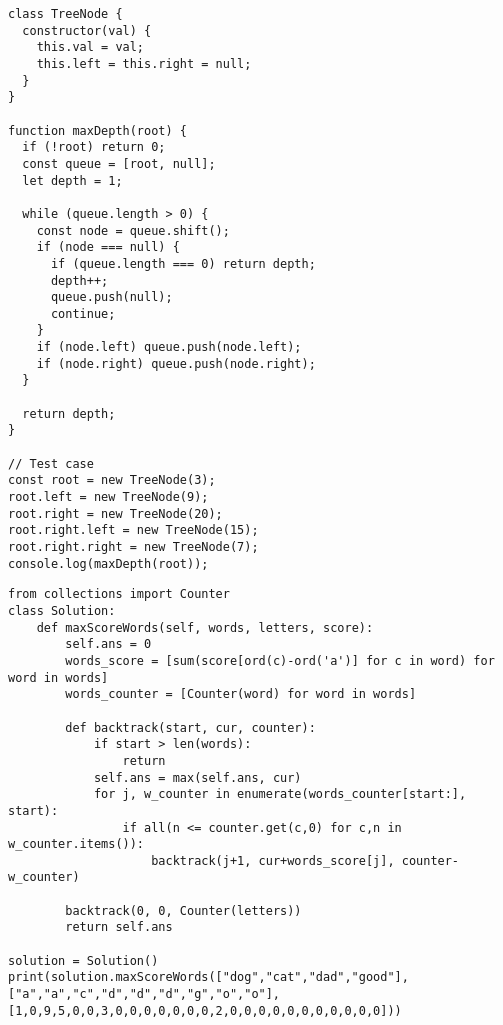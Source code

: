 \begin{tcolorbox}[left=0mm,right=0mm,top=0mm,bottom=0mm,boxsep=1mm,arc=0mm,boxrule=0pt, frame empty, breakable]
    \small
    \begin{lstlisting}
class TreeNode {
  constructor(val) {
    this.val = val;
    this.left = this.right = null;
  }
}

function maxDepth(root) {
  if (!root) return 0;
  const queue = [root, null];
  let depth = 1;

  while (queue.length > 0) {
    const node = queue.shift();
    if (node === null) {
      if (queue.length === 0) return depth;
      depth++;
      queue.push(null);
      continue;
    }
    if (node.left) queue.push(node.left);
    if (node.right) queue.push(node.right);
  }

  return depth;
}

// Test case
const root = new TreeNode(3);
root.left = new TreeNode(9);
root.right = new TreeNode(20);
root.right.left = new TreeNode(15);
root.right.right = new TreeNode(7);
console.log(maxDepth(root));
\end{lstlisting}
\end{tcolorbox}



\begin{tcolorbox}[left=0mm,right=0mm,top=0mm,bottom=0mm,boxsep=1mm,arc=0mm,boxrule=0pt, frame empty, breakable]
    \small
    \begin{lstlisting}
from collections import Counter
class Solution:
    def maxScoreWords(self, words, letters, score):
        self.ans = 0
        words_score = [sum(score[ord(c)-ord('a')] for c in word) for word in words]
        words_counter = [Counter(word) for word in words]

        def backtrack(start, cur, counter):
            if start > len(words):
                return
            self.ans = max(self.ans, cur)
            for j, w_counter in enumerate(words_counter[start:], start):
                if all(n <= counter.get(c,0) for c,n in w_counter.items()):
                    backtrack(j+1, cur+words_score[j], counter-w_counter)

        backtrack(0, 0, Counter(letters))
        return self.ans

solution = Solution()
print(solution.maxScoreWords(["dog","cat","dad","good"], ["a","a","c","d","d","d","g","o","o"], [1,0,9,5,0,0,3,0,0,0,0,0,0,0,2,0,0,0,0,0,0,0,0,0,0,0]))
\end{lstlisting}
\end{tcolorbox}

